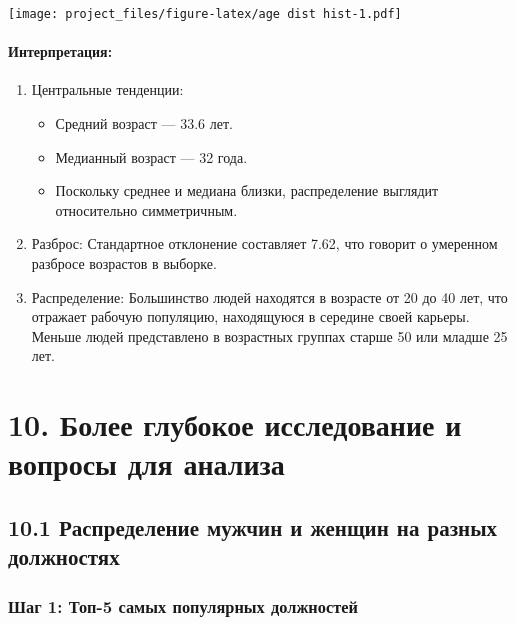 \documentclass[
]{article}
\providecommand{\tightlist}{%
  \setlength{\itemsep}{0pt}\setlength{\parskip}{0pt}}
\begin{document}
\texttt{[image: project\_files/figure-latex/age dist hist-1.pdf]}

\paragraph{Интерпретация:}\label{ux438ux43dux442ux435ux440ux43fux440ux435ux442ux430ux446ux438ux44f-1}

\begin{enumerate}
\def\labelenumi{\arabic{enumi}.}
\item
  Центральные тенденции:

  \begin{itemize}
  \tightlist
  \item
    Средний возраст --- 33.6 лет.
  \item
    Медианный возраст --- 32 года.
  \item
    Поскольку среднее и медиана близки, распределение выглядит
    относительно симметричным.
  \end{itemize}
\item
  Разброс: Стандартное отклонение составляет 7.62, что говорит о
  умеренном разбросе возрастов в выборке.
\item
  Распределение: Большинство людей находятся в возрасте от 20 до 40 лет,
  что отражает рабочую популяцию, находящуюся в середине своей карьеры.
  Меньше людей представлено в возрастных группах старше 50 или младше 25
  лет.
\end{enumerate}

\section{10. Более глубокое исследование и вопросы для
анализа}\label{ux431ux43eux43bux435ux435-ux433ux43bux443ux431ux43eux43aux43eux435-ux438ux441ux441ux43bux435ux434ux43eux432ux430ux43dux438ux435-ux438-ux432ux43eux43fux440ux43eux441ux44b-ux434ux43bux44f-ux430ux43dux430ux43bux438ux437ux430}

\subsection{10.1 Распределение мужчин и женщин на разных
должностях}\label{ux440ux430ux441ux43fux440ux435ux434ux435ux43bux435ux43dux438ux435-ux43cux443ux436ux447ux438ux43d-ux438-ux436ux435ux43dux449ux438ux43d-ux43dux430-ux440ux430ux437ux43dux44bux445-ux434ux43eux43bux436ux43dux43eux441ux442ux44fux445}

\subsubsection{Шаг 1: Топ-5 самых популярных
должностей}\label{ux448ux430ux433-1-ux442ux43eux43f-5-ux441ux430ux43cux44bux445-ux43fux43eux43fux443ux43bux44fux440ux43dux44bux445-ux434ux43eux43bux436ux43dux43eux441ux442ux435ux439}
\end{document}

